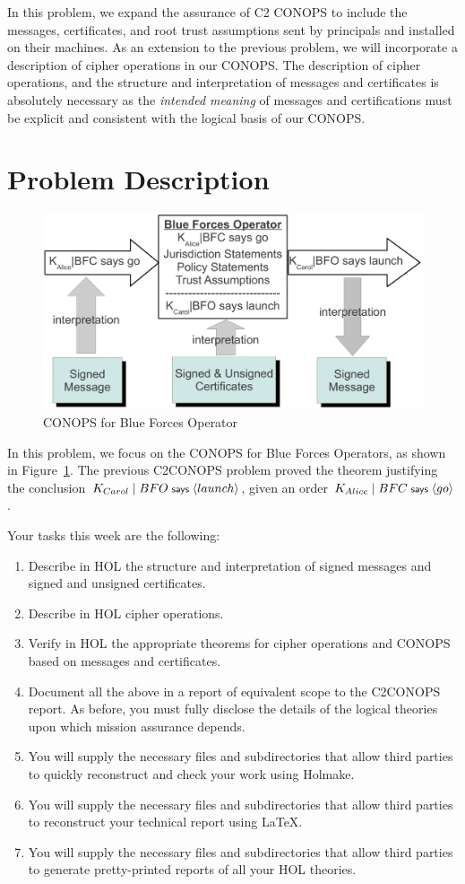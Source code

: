 \message{ !name(secureMessages.tex)}\documentclass[10pt,twoside]{article}
\newcommand{\action}[1]{\ensuremath{\langle #1 \rangle}}
\begin{document}
In this problem, we expand the assurance of C2 CONOPS to include the
messages, certificates, and root trust assumptions sent by principals
and installed on their machines. As an extension to the previous
problem, we will incorporate a description of cipher operations in our
CONOPS. The description of cipher operations, and the structure and
interpretation of messages and certificates is absolutely necessary as
the \emph{intended meaning} of messages and certifications must be
explicit and consistent with the logical basis of our CONOPS.

\section{Problem Description}
\label{sec:problem-description}

\begin{figure}[t]
  \centering
  \includegraphics[width=0.6\linewidth]{Figures/messageCONOPS}
  \caption{CONOPS for Blue Forces Operator}
  \label{fig:BFO-CONOPS}
\end{figure}

In this problem, we focus on the CONOPS for Blue Forces Operators, as
shown in Figure~\ref{fig:BFO-CONOPS}. The previous C2CONOPS problem
proved the theorem justifying the conclusion $K_{Carol} \quoting BFO
\says \action{launch}$, given an order $K_{Alice} \quoting BFC \says
\action{go}$.

Your tasks this week are the following:
\begin{enumerate}
\item Describe in HOL the structure and interpretation of signed
  messages and signed and unsigned certificates.
\item Describe in HOL cipher operations.
\item Verify in HOL the appropriate theorems for cipher operations and
  CONOPS based on messages and certificates.
\item Document all the above in a report of equivalent scope to the
  C2CONOPS report.  As before, you must fully disclose the details of
  the logical theories upon which mission assurance depends.
\item You will supply the necessary files and subdirectories that
  allow third parties to quickly reconstruct and check your work using
  Holmake.
\item You will supply the necessary files and subdirectories that
  allow third parties to reconstruct your technical report using
  \LaTeX{}.
\item You will supply the necessary files and subdirectories that
  allow third parties to generate pretty-printed reports of all your
  HOL theories.
\end{enumerate}
\end{document}
